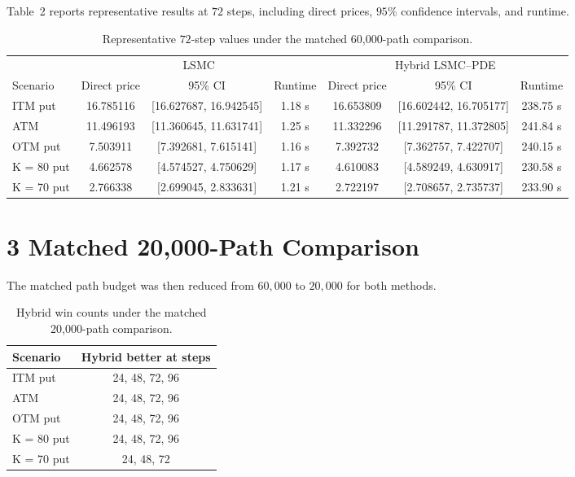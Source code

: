 \documentclass[11pt,a4paper]{article}
\begin{document}
Table~2 reports representative results at \(72\) steps, including direct prices, \(95\%\) confidence intervals, and runtime.

\begin{table}[p]
\centering
\caption{Representative \(72\)-step values under the matched 60,000-path comparison.}
\begin{tabular}{lcccccc}
\toprule
& \multicolumn{3}{c}{LSMC} & \multicolumn{3}{c}{Hybrid LSMC--PDE} \\
\cmidrule(lr){2-4}\cmidrule(lr){5-7}
Scenario & Direct price & 95\% CI & Runtime & Direct price & 95\% CI & Runtime \\
\midrule
ITM put & 16.785116 & [16.627687, 16.942545] & 1.18 s & 16.653809 & [16.602442, 16.705177] & 238.75 s \\
ATM & 11.496193 & [11.360645, 11.631741] & 1.25 s & 11.332296 & [11.291787, 11.372805] & 241.84 s \\
OTM put & 7.503911 & [7.392681, 7.615141] & 1.16 s & 7.392732 & [7.362757, 7.422707] & 240.15 s \\
K = 80 put & 4.662578 & [4.574527, 4.750629] & 1.17 s & 4.610083 & [4.589249, 4.630917] & 230.58 s \\
K = 70 put & 2.766338 & [2.699045, 2.833631] & 1.21 s & 2.722197 & [2.708657, 2.735737] & 233.90 s \\
\bottomrule
\end{tabular}
\end{table}

\section*{3 \quad Matched 20,000-Path Comparison}

The matched path budget was then reduced from \(60{,}000\) to \(20{,}000\) for both methods.

\begin{table}[h!]
\centering
\caption{Hybrid win counts under the matched 20,000-path comparison.}
\begin{tabular}{lc}
\toprule
Scenario & Hybrid better at steps \\
\midrule
ITM put & 24, 48, 72, 96 \\
ATM & 24, 48, 72, 96 \\
OTM put & 24, 48, 72, 96 \\
K = 80 put & 24, 48, 72, 96 \\
K = 70 put & 24, 48, 72 \\
\bottomrule
\end{tabular}
\end{table}
\end{document}
